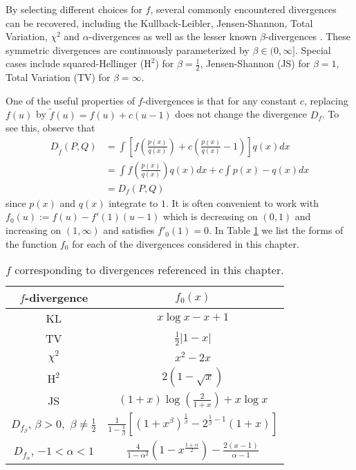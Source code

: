 By selecting different choices for $f$, several commonly encountered divergences can be recovered, including the Kullback-Leibler, Jensen-Shannon, Total Variation, $\chi^2$ and $\alpha$-divergences as well as the lesser known $\beta$-divergences \citep{osterreicher2003new}.
These symmetric divergences are continuously parameterized by $\beta\in(0, \infty]$. Special cases include squared-Hellinger ($\mathrm{H}^2$) for ${\beta=\frac{1}{2}}$,  Jensen-Shannon (JS) for $\beta=1$, Total Variation (TV) for $\beta=\infty$. 

One of the useful properties of $f$-divergences is that for any constant $c$, replacing $f(u)$ by $\tilde{f}(u) = f(u) + c(u-1)$ does not change the divergence $D_f$. 
To see this, observe that
%
\begin{align*}
D_{\tilde{f}}(P, Q) &= \int \left[ f\left(\frac{p(x)}{q(x)}\right) + c\left(\frac{p(x)}{q(x)} - 1\right) \right] q(x) dx \\
&=  \int f\left(\frac{p(x)}{q(x)}\right) q(x) dx + c \int p(x) - q(x) dx \\
&= D_f(P, Q)
\end{align*}
%
since $p(x)$ and $q(x)$ integrate to $1$.
It is often convenient to work with $f_0(u) := f(u) - f'(1)(u-1)$ which is decreasing on $(0, 1)$ and increasing on $(1, \infty)$ and satisfies $f'_0(1)=0$.
In Table \ref{table:f-fns} we list the forms of the function $f_0$ for each of the divergences considered in this chapter.






{
\renewcommand{\arraystretch}{2}
\begin{table}
 \caption{$f$ corresponding to divergences referenced in this chapter.}
 \label{table:f-fns}
 \centering
 \begin{tabular}{c c} 
 \toprule
 $f$-divergence & $f_0(x)$ \\
 \midrule
 KL & $x \log x - x + 1$\\
 TV & $\frac{1}{2}|1-x|$\\
 $\chi^2$ & $x^2 - 2x$\\
 $\text{H}^2$ & $2(1-\sqrt{x})$\\
 JS & $(1+x)\log(\frac{2}{1+x}) + x\log x$\\
 $D_{f_\beta}$, $\beta > 0,$ $\beta\not=\frac{1}{2}$ & $\frac{1}{1-\frac{1}{\beta}}\left[ (1+x^\beta)^{\frac{1}{\beta}} - 2^{\frac{1}{\beta}-1}(1+x) \right]$\\
 $D_{f_\alpha}$, $-1<\alpha < 1$ & $\frac{4}{1-\alpha^2}\left( 1 - x^{\frac{1+\alpha}{2}} \right) - \frac{2(x-1)}{\alpha-1}$ \\
 \bottomrule
\end{tabular}
\end{table}
}


